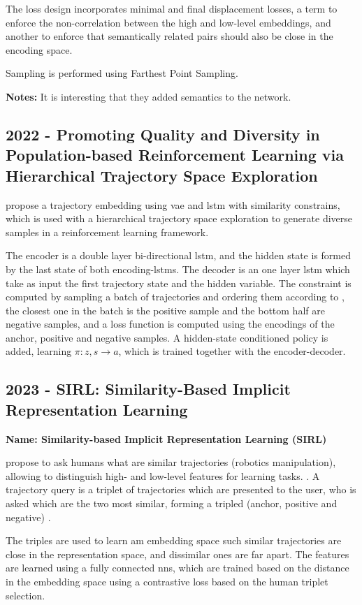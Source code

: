 The loss design incorporates minimal and final displacement losses, a term to enforce the non-correlation between the high and low-level embeddings, and another to enforce that semantically related pairs should also be close in the encoding space.

Sampling is performed using Farthest Point Sampling.

\textbf{Notes:} It is interesting that they added semantics to the network.

\subsection*{2022 - Promoting Quality and Diversity in Population-based Reinforcement Learning via Hierarchical Trajectory Space Exploration}

\cite{miao2022promoting} propose a trajectory embedding using \gls{vae} and \gls{lstm} with similarity constrains, which is used with a hierarchical trajectory space exploration to generate diverse samples in a reinforcement learning framework.

The encoder is a double layer bi-directional \gls{lstm}, and the hidden state is formed by the last state of both encoding-\glspl{lstm}.
%
The decoder is an one layer \gls{lstm} which take as input the first trajectory state and the hidden variable.
%
The constraint is computed by sampling a batch of trajectories and ordering them according to , the closest one in the batch is the positive sample and the bottom half are negative samples, and a loss function is computed using the encodings of the anchor, positive and negative samples.
%
A hidden-state conditioned  policy is added, learning $\pi:z, s \rightarrow a$, which is trained together with the encoder-decoder.


\subsection*{2023 - SIRL: Similarity-Based Implicit Representation Learning}

\textbf{Name: Similarity-based Implicit Representation Learning (SIRL)}

\cite{bobu2023sirl} propose to ask humans what are similar trajectories (robotics manipulation), allowing to distinguish high- and low-level features for learning tasks. .
%
A trajectory query is a triplet of trajectories which are presented to the user, who is asked which are the two most similar, forming a tripled (anchor, positive and negative) .

The triples are used to learn am embedding space such similar trajectories are close in the representation space, and dissimilar ones are far apart.
%
The features are learned using a fully connected \glspl{nn}, which are trained based on the distance in the embedding space using a contrastive loss based on the human triplet selection.

